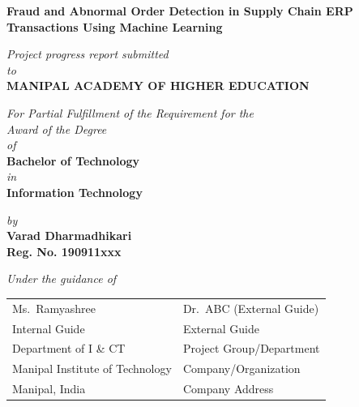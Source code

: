 \documentclass[a4paper,12pt]{article}
\begin{document}
\begin{titlepage}
\vspace*{1.3cm}
    \begin{center}
    \large{\textbf{Fraud and Abnormal Order Detection in Supply Chain ERP Transactions Using Machine Learning}}
    \end{center}
    \vspace{0.5cm}
    \begin{center}
    \small{\textit{Project progress report submitted} \\ \vspace{0.25cm} \textit{to} \\ \vspace{0.25cm}\textbf{MANIPAL ACADEMY OF HIGHER EDUCATION}}
    \end{center}
    \vspace{0.25cm}
    \begin{center}
    \small{\textit{For Partial Fulfillment of the Requirement for the\\ \vspace{0.25cm}Award of the Degree\\ \vspace{0.25cm}of}} \\ \vspace{0.25cm}
    \textbf{Bachelor of Technology} \\  \vspace{0.25cm} \textit{in} \\ \textbf{Information Technology}
    \end{center}

    \begin{center}
    \small{\textit{by}} \\
    \textbf{Varad Dharmadhikari} \\ \textbf{Reg. No. 190911xxx} \\
    \end{center}

\begin{center}
    \small{\textit{Under the guidance of}} \\
\renewcommand{\baselinestretch}{1}
{
\begin{table}[h]
    \centering
        \begin{tabular}{p{3in} p{3in}}
            Ms.~Ramyashree &  Dr.~ABC (External Guide)  \\
            Internal Guide & External Guide \\
            Department of I \& CT  &  Project Group/Department  \\
             Manipal Institute of Technology & Company/Organization \\
            Manipal, India & Company Address
        \end{tabular}
\end{table}
}
\end{center}


\end{titlepage}
\end{document}
